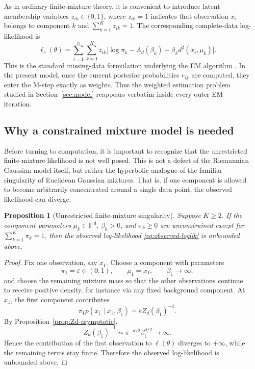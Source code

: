 \documentclass[11pt]{article}
\newtheorem{proposition}[theorem]{Proposition}
\begin{document}
As in ordinary finite-mixture theory, it is convenient to introduce latent membership variables \(z_{ik}\in\{0,1\}\), where \(z_{ik}=1\) indicates that observation \(x_i\) belongs to component \(k\) and \(\sum_{k=1}^K z_{ik}=1\). The corresponding complete-data log-likelihood is
\begin{equation}\label{eq:complete-data-loglik}
\ell_c(\theta)
=
\sum_{i=1}^n\sum_{k=1}^K
z_{ik}
\Big[
\log\pi_k-A_d(\beta_k)-\beta_k d^2(x_i,\mu_k)
\Big].
\end{equation}
This is the standard missing-data formulation underlying the EM algorithm \citep{dempster_1977_MaximumLikelihoodIncomplete}. In the present model, once the current posterior probabilities \(r_{ik}\) are computed, they enter the M-step exactly as weights. Thus the weighted estimation problem studied in Section~\ref{sec:model} reappears verbatim inside every outer EM iteration.

\subsection{Why a constrained mixture model is needed}\label{subsec:constrained-mixture}

Before turning to computation, it is important to recognize that the unrestricted finite-mixture likelihood is not well posed. This is not a defect of the Riemannian Gaussian model itself, but rather the hyperbolic analogue of the familiar singularity of Euclidean Gaussian mixtures. That is, if one component is allowed to become arbitrarily concentrated around a single data point, the observed likelihood can diverge.

\begin{proposition}[Unrestricted finite-mixture singularity]\label{prop:mixture-singularity}
Suppose \(K\ge 2\). If the component parameters \(\mu_k\in\mathbb{H}^d\), \(\beta_k>0\), and \(\pi_k\ge 0\) are unconstrained except for \(\sum_{k=1}^K \pi_k=1\), then the observed log-likelihood \eqref{eq:observed-loglik} is unbounded above.
\end{proposition}

\begin{proof}
Fix one observation, say \(x_1\). Choose a component with parameters
\[
\pi_1=\varepsilon\in(0,1),
\qquad
\mu_1=x_1,
\qquad
\beta_1\to\infty,
\]
and choose the remaining mixture mass so that the other observations continue to receive positive density, for instance via any fixed background component. At \(x_1\), the first component contributes
\[
\pi_1 p(x_1\mid x_1,\beta_1)
=
\varepsilon Z_d(\beta_1)^{-1}.
\]
By Proposition~\ref{prop:Zd-asymptotic},
\[
Z_d(\beta_1)^{-1}\sim \pi^{-d/2}\beta_1^{d/2}\to\infty.
\]
Hence the contribution of the first observation to \(\ell(\theta)\) diverges to \(+\infty\), while the remaining terms stay finite. Therefore the observed log-likelihood is unbounded above.
\end{proof}
\end{document}

